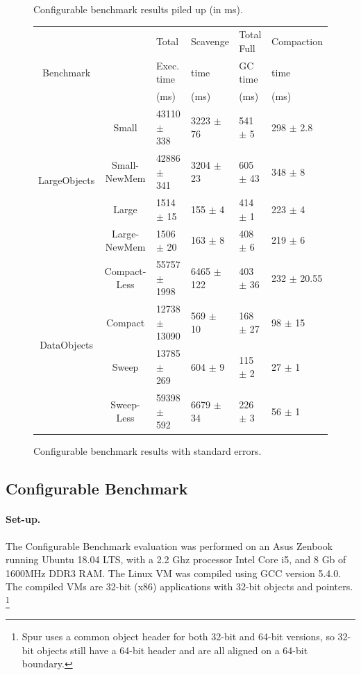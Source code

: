 \documentclass[10pt, sigplan]{acmart}
\begin{document}
\begin{figure}[b!]
   	   	    	
\caption{Configurable benchmark results piled up (in ms).} \label{ConfigRes1}
\end{figure}

\begin{figure}[b!]
\begin{tabular}{|c|c|l|l|l|l|}
   \hline
  & & Total   & Scavenge  & Total Full  & Compaction   \\
 Benchmark & &  Exec. time &  time & GC time &  time \\
  & &  (ms) &  (ms) & (ms) &  (ms)\\
   \hline
   \multirow{4}{*}{LargeObjects} & Small 	& 43110 $\pm$ 338 &	3223 $\pm$ 76 	& 541 $\pm$ 5 	&298 $\pm$ 2.8  \\
    				    & Small-NewMem 	& 42886 $\pm$ 341 &	3204 $\pm$ 23 	& 605 $\pm$ 43 	&348 $\pm$ 8  \\
    				    & Large 	& 1514 $\pm$ 15 &	155 $\pm$ 4 	& 414 $\pm$ 1 	&223 $\pm$ 4  \\
    				    & Large-NewMem 		& 1506 $\pm$ 20 &	163 $\pm$ 8 	& 408 $\pm$ 6 	&219 $\pm$ 6  \\
   \hline
   \multirow{4}{*}{DataObjects} 	& Compact-Less 		& 55757 $\pm$ 1998 &	6465 $\pm$ 122 	& 403 $\pm$ 36 	&232 $\pm$ 20.55  \\
    				    			& Compact 	& 12738 $\pm$ 13090 &	569 $\pm$ 10 	& 168 $\pm$ 27 	&98 $\pm$ 15  \\
    				    & Sweep 	& 13785 $\pm$ 269 &	604 $\pm$ 9 	& 115 $\pm$ 2 	&27 $\pm$ 1 \\
    				    & Sweep-Less 		& 59398 $\pm$ 592 &	6679 $\pm$ 34 	& 226 $\pm$ 3 	&56 $\pm$ 1 \\

   \hline
\end{tabular} 
\caption{Configurable benchmark results with standard errors.} \label{ConfigRes2}
\end{figure}


\subsection{Configurable Benchmark}

\paragraph{Set-up.}The Configurable Benchmark evaluation was performed on an Asus Zenbook running Ubuntu 18.04 LTS, with a 2.2 Ghz processor Intel Core i5, and 8 Gb of 1600MHz DDR3 RAM. The Linux VM was compiled using GCC version 5.4.0. The compiled VMs are 32-bit (x86) applications with 32-bit objects and pointers. \footnote{Spur uses a common object header for both 32-bit and 64-bit versions, so 32-bit objects still have a 64-bit header and are all aligned on a 64-bit boundary.}
\end{document}
